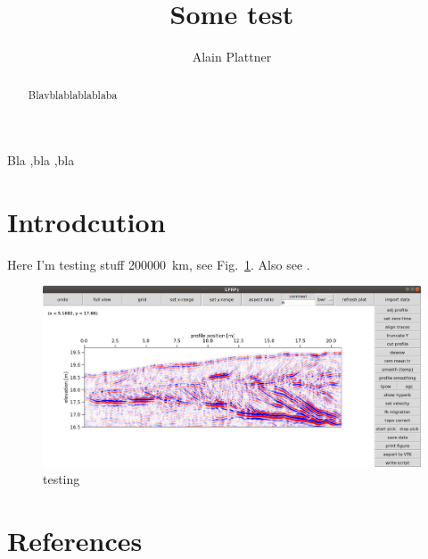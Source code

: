 \documentclass[authoryear,5p,times]{elsarticle}
\begin{document}
\begin{frontmatter}
  \title{Some test}

  \author[Alain]{Alain Plattner}
  \address[Alain]{Somewhere far away}

  \begin{abstract}
    Blavblablablablaba
  \end{abstract}

  \begin{keyword}
    Bla \sep bla \sep bla
  \end{keyword}
\end{frontmatter}

  
\section{Introdcution}

Here I'm testing stuff \SI{200000}{\kilo \meter}, see Fig.~\ref{bla}. Also see \cite{Peterson2525}.

\begin{figure}[h]
  \includegraphics[width=\textwidth]{Figures/profileGUI.png}
  \caption{\label{bla} testing}
\end{figure}


\section*{References}


\end{document}
